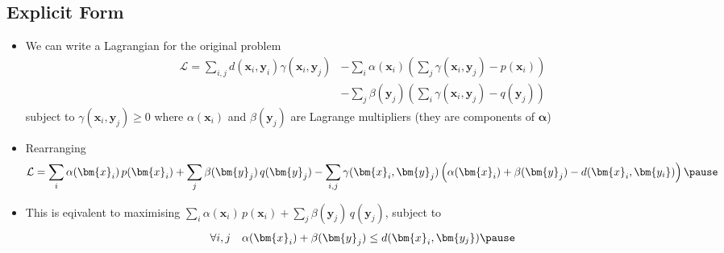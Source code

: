 \begin{slide}
  \section{Explicit Form}


\begin{PauseHighLight}
  \begin{itemize}\footnotesize
  \item We can write a Lagrangian for the original problem
    \begin{align*}
      \mathcal{L} = \sum_{i,j} d(\bm{x}_i,\bm{y}_i)
      \gamma(\bm{x}_i,\bm{y}_j)
      &- \sum_i \alpha(\bm{x}_i) \left( \sum_j \gamma(\bm{x}_i,\bm{y}_j) -p(\bm{x}_i)\right)\\
      &- \sum_j \beta(\bm{y}_j) \left( \sum_i \gamma(\bm{x}_i,\bm{y}_j) -q(\bm{y}_j)\right)
    \end{align*}
    subject to $\gamma(\bm{x}_i,\bm{y}_j)\geq 0$\pause{} where $\alpha(\bm{x}_i)$ and $\beta(\bm{y}_j)$
    are Lagrange multipliers (they are components of $\bm{\alpha}$)\pauseb
  \item Rearranging
    \begin{align*}
      \mathcal{L} = \sum_i \alpha(\bm{x}_i)\,p(\bm{x}_i) + \sum_j \beta(\bm{y}_j)\,q(\bm{y}_j)
      -\sum_{i,j} \gamma(\bm{x}_i,\bm{y}_j)\left( \alpha(\bm{x}_i) + \beta(\bm{y}_j) -
      d(\bm{x}_i,\bm{y_i})\right)\pause
    \end{align*}
  \item This is eqivalent to maximising $\sum_i \alpha(\bm{x}_i)\,p(\bm{x}_i) +
    \sum_j \beta(\bm{y}_j)\,q(\bm{y}_j)$, subject to
    \begin{align*}
      \forall i,j \quad \alpha(\bm{x}_i) + \beta(\bm{y}_j) \leq d(\bm{x}_i,\bm{y_j})\pause
    \end{align*}
  \end{itemize}
\end{PauseHighLight}

\end{slide}



